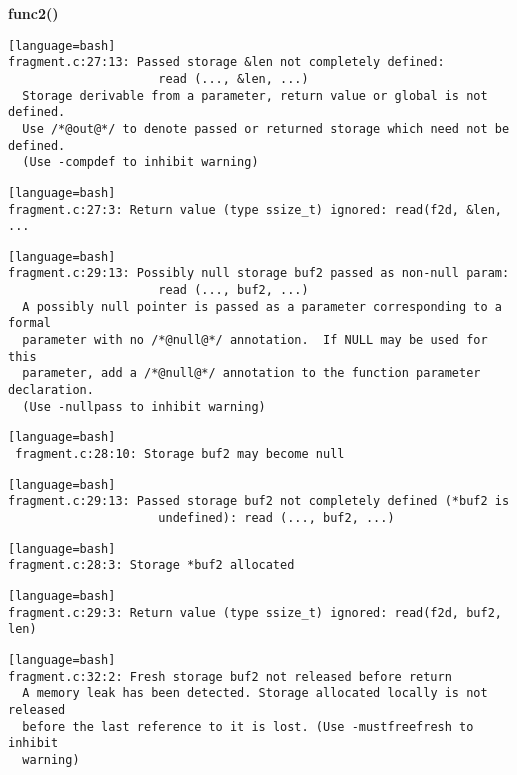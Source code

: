\documentclass[a4paper,12pt]{article}
\begin{document}
\noindent
\textbf{func2()}\\
\begin{lstlisting}[style=DOS][language=bash]
fragment.c:27:13: Passed storage &len not completely defined:
                     read (..., &len, ...)
  Storage derivable from a parameter, return value or global is not defined.
  Use /*@out@*/ to denote passed or returned storage which need not be defined.
  (Use -compdef to inhibit warning)
\end{lstlisting}

\begin{lstlisting}[style=DOS][language=bash]
fragment.c:27:3: Return value (type ssize_t) ignored: read(f2d, &len, ...
\end{lstlisting}


\begin{lstlisting}[style=DOS][language=bash]
fragment.c:29:13: Possibly null storage buf2 passed as non-null param:
                     read (..., buf2, ...)
  A possibly null pointer is passed as a parameter corresponding to a formal
  parameter with no /*@null@*/ annotation.  If NULL may be used for this
  parameter, add a /*@null@*/ annotation to the function parameter declaration.
  (Use -nullpass to inhibit warning)
\end{lstlisting}

\begin{lstlisting}[style=DOS][language=bash]
 fragment.c:28:10: Storage buf2 may become null
\end{lstlisting}


\begin{lstlisting}[style=DOS][language=bash]
fragment.c:29:13: Passed storage buf2 not completely defined (*buf2 is
                     undefined): read (..., buf2, ...)
\end{lstlisting}

\begin{lstlisting}[style=DOS][language=bash]
fragment.c:28:3: Storage *buf2 allocated
\end{lstlisting}

\begin{lstlisting}[style=DOS][language=bash]
fragment.c:29:3: Return value (type ssize_t) ignored: read(f2d, buf2, len)
\end{lstlisting}

\begin{lstlisting}[style=DOS][language=bash]
fragment.c:32:2: Fresh storage buf2 not released before return
  A memory leak has been detected. Storage allocated locally is not released
  before the last reference to it is lost. (Use -mustfreefresh to inhibit
  warning)
\end{lstlisting}
\end{document}
